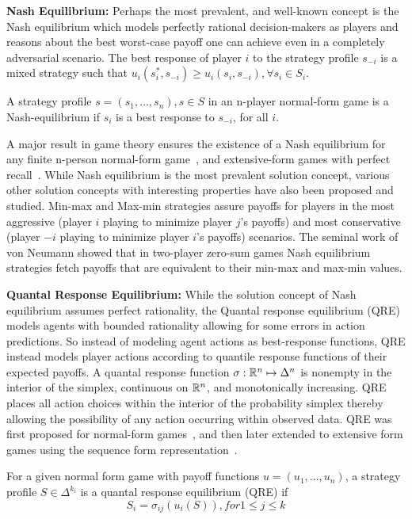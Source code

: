 \textbf{Nash Equilibrium:}
Perhaps the most prevalent, and well-known concept is the Nash equilibrium which models perfectly
rational decision-makers as players and reasons about the best worst-case payoff one can achieve
even in a completely adversarial scenario.
The best response of player $i$ to the strategy profile $s_{-i}$ is a mixed strategy such that
$u_i(s_i^\ast, s_{-i}) \geq u_i(s_i, s_{-i}), \forall s_i \in S_i$.

\begin{definition}
	A strategy profile $s=(s_1, \dots, s_n), s \in S$ in an n-player normal-form game is a Nash-equilibrium if $s_i$ is a best response to $s_{-i}$, for all
	$i$.
\end{definition}

A major result in game theory ensures the existence of a Nash equilibrium for any finite n-person
normal-form game~\cite{nashEquilibrium1950}, and extensive-form games with perfect
recall~\cite{kuhnExtensive1950}.
While Nash equilibrium is the most prevalent solution concept, various other solution concepts with
interesting properties have also been proposed and studied.
Min-max and Max-min strategies assure payoffs for players in the most aggressive (player $i$
playing to minimize player $j$'s payoffs) and most conservative (player $-i$ playing to minimize
player $i$'s payoffs) scenarios.
The seminal work of von Neumann showed that in two-player zero-sum games Nash equilibrium
strategies fetch payoffs that are equivalent to their min-max and max-min values.

\textbf{Quantal Response Equilibrium:}
While the solution concept of Nash equilibrium assumes perfect rationality, the Quantal response
equilibrium (QRE) models agents with bounded rationality allowing for some errors in action
predictions.
So instead of modeling agent actions as best-response functions, QRE instead models player actions
according to quantile response functions of their expected payoffs.
A quantal response function $\sigma: \mathbb{R}^n \mapsto \Delta^n$ is nonempty in the interior of the
simplex, continuous on $\mathbb{R}^n$, and monotonically increasing.
QRE places all action choices within the interior of the probability simplex thereby allowing the
possibility of any action occurring within observed data.
QRE was first proposed for normal-form games~\cite{mckelveyQuantal1995}, and then later extended to
extensive form games using the sequence form representation~\cite{mckelveyQuantal1998}.

\begin{definition}
	For a given normal form game with payoff functions $u=(u_1,\dots, u_n)$, a strategy profile $S \in \Delta^{k_i}$ is
	a quantal response equilibrium (QRE) if
	$$ S_i = \sigma_{ij}(u_i(S)), for 1 \leq j \leq k$$

\end{definition}

